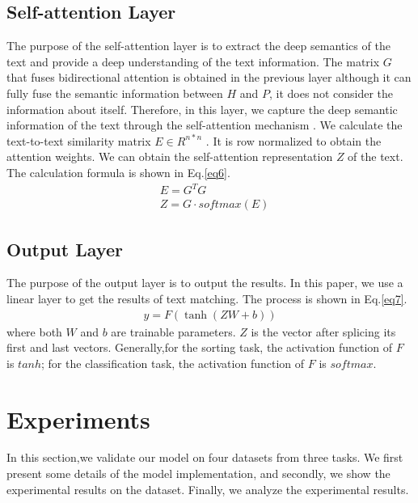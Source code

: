 \documentclass[review]{elsarticle}
\begin{document}
\subsection{Self-attention Layer}
The purpose of the self-attention layer is to extract the deep semantics of the text and provide a deep understanding of the text information. The matrix $G$ that fuses bidirectional attention is obtained in the previous layer although it can fully fuse the semantic information between $H$ and $P$, it does not consider the information about itself. Therefore, in this layer, we capture the deep semantic information of the text through the self-attention mechanism \cite{vaswani2017attention}.  We calculate the text-to-text similarity matrix $E\in {{R}^{n*n}}$ . It is row normalized to obtain the attention weights. We can obtain the self-attention representation $Z$ of the text. The calculation formula is shown in Eq.\ref{eq6}.
\begin{equation}\label{eq6}
\begin{aligned}
    & E={{G}^{T}}G \\ 
 & Z=G\cdot softmax (E) 
\end{aligned}
\end{equation}



\subsection{Output Layer}

The purpose of the output layer is to output the results. In this paper, we use a linear layer to get the results of text matching. The process is shown  in Eq.\ref{eq7}.
\begin{equation}\label{eq7}
\begin{aligned}
   y = F(\tanh (ZW + b))
\end{aligned}
\end{equation}
where both $W$ and $b$ are trainable parameters. $Z$ is the vector after splicing its first and last vectors. Generally,for the sorting task, the activation function of $F$ is $tanh$; for the classification task, the activation function of $F$ is $softmax$.
\section{Experiments}
In this section,we validate our model on four datasets from three tasks. We first present some details of the model implementation, and secondly, we show the experimental results on the dataset. Finally, we analyze the experimental results.
\end{document}

